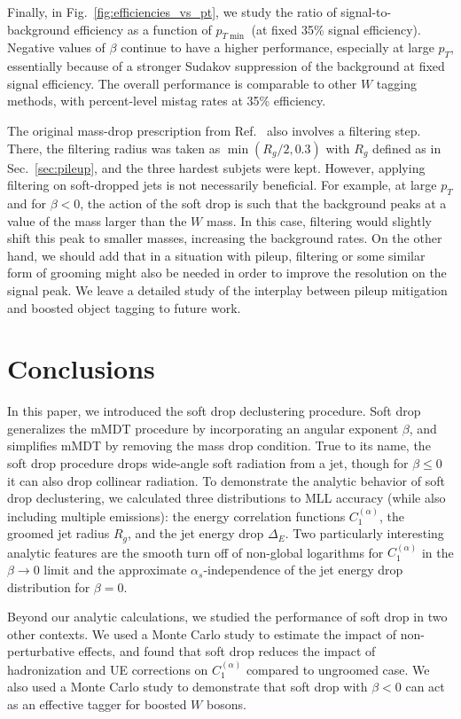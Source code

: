 \documentclass[letterpaper,11pt]{article}
\newcommand{\C}[2]{C^{(#2)}_{#1}}
\DeclareRobustCommand{\Sec}[1]{Sec.~\ref{#1}}
\DeclareRobustCommand{\Fig}[1]{Fig.~\ref{#1}}
\DeclareRobustCommand{\Ref}[1]{Ref.~\cite{#1}}
\begin{document}
Finally, in \Fig{fig:efficiencies_vs_pt}, we study the ratio of signal-to-background efficiency as a function of $p_{T \min}$ (at fixed 35\% signal efficiency).  Negative values of $\beta$ continue to have a higher performance, especially at large $p_T$, essentially because of a stronger Sudakov suppression of the background at fixed signal efficiency. The overall performance is comparable to other $W$ tagging methods, with percent-level mistag rates at 35\% efficiency.

The original mass-drop prescription from \Ref{BDRS} also involves a filtering step.  There, the filtering radius was taken as $\min(R_g/2, 0.3)$ with $R_g$ defined as in \Sec{sec:pileup}, and the three hardest subjets were kept. 
%
However, applying filtering on soft-dropped jets is not necessarily beneficial. For example, at large $p_T$ and for
$\beta<0$, the action of the soft drop is such that the background
peaks at a value of the mass larger than the $W$ mass. In this case, filtering would slightly
shift this peak to smaller masses, increasing the background
rates. On the other hand, we should add that in a situation with pileup, filtering
or some similar form of grooming might also be needed in order to
improve the resolution on the signal peak. We leave a detailed study of the interplay between pileup mitigation and boosted object tagging to future work.


\section{Conclusions}
\label{sec:conclude}

In this paper, we introduced the soft drop declustering procedure. Soft drop generalizes the mMDT procedure by incorporating an angular exponent $\beta$, and simplifies mMDT by removing the mass drop condition.   True to its name, the soft drop procedure drops wide-angle soft radiation from a jet, though for $\beta \le 0$ it can also drop collinear radiation.  To demonstrate the analytic behavior of soft drop declustering, we calculated three distributions to MLL accuracy (while also including multiple emissions):  the energy correlation functions $\C{1}{\alpha}$, the groomed jet radius $R_g$, and the jet energy drop $\Delta_E$.  Two particularly interesting analytic features are the smooth turn off of non-global logarithms for $\C{1}{\alpha}$ in the $\beta \to 0$ limit and the approximate $\alpha_s$-independence of the jet energy drop distribution for $\beta = 0$.  

Beyond our analytic calculations, we studied the performance of soft drop in two other contexts.  We used a Monte Carlo study to estimate the impact of non-perturbative effects, and found that soft drop reduces the impact of hadronization and UE corrections on $\C{1}{\alpha}$ compared to ungroomed case.  We also used a Monte Carlo study to demonstrate that soft drop with $\beta < 0$ can act as an effective tagger for boosted $W$ bosons.
\end{document}

